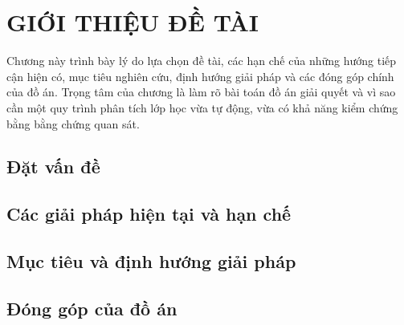\documentclass[a4paper,13pt,3p,twoside]{report}
\numberwithin{equation}{chapter}
\theoremstyle{definition}
\begin{document}
\renewcommand{\listfigurename}{DANH MỤC HÌNH VẼ}
{\let\oldnumberline\numberline
\renewcommand{\numberline}{Hình~\oldnumberline}
\listoffigures}
\newpage

\renewcommand{\listtablename}{DANH MỤC BẢNG BIỂU}
{\let\oldnumberline\numberline
\renewcommand{\numberline}{Bảng~\oldnumberline}
\listoftables}
\newpage

\glsaddall
\renewcommand*{\acronymname}{DANH MỤC THUẬT NGỮ VÀ TỪ VIẾT TẮT}
\renewcommand*{\entryname}{Thuật ngữ}
\renewcommand*{\descriptionname}{Ý nghĩa}
\printnoidxglossary[type=\acronymtype]

\renewcommand\appendixname{PHỤ LỤC}
\renewcommand\appendixpagename{PHỤ LỤC}
\renewcommand\appendixtocname{PHỤ LỤC}

\newpage
\hypersetup{pageanchor=true}
\pagestyle{fancy}
\fancyhf{}
\renewcommand{\chaptermark}[1]{\markboth{CHƯƠNG \thechapter. #1}{}}
\fancyhead[RE,LO]{\leftmark}
\fancyfoot[RE,LO]{\thepage}

\chapter{GIỚI THIỆU ĐỀ TÀI}

Chương này trình bày lý do lựa chọn đề tài, các hạn chế của những hướng tiếp cận hiện có, mục tiêu nghiên cứu, định hướng giải pháp và các đóng góp chính của đồ án. Trọng tâm của chương là làm rõ bài toán đồ án giải quyết và vì sao cần một quy trình phân tích lớp học vừa tự động, vừa có khả năng kiểm chứng bằng bằng chứng quan sát.

\section{Đặt vấn đề}


\section{Các giải pháp hiện tại và hạn chế}


\section{Mục tiêu và định hướng giải pháp}


\section{Đóng góp của đồ án}

\end{document}
